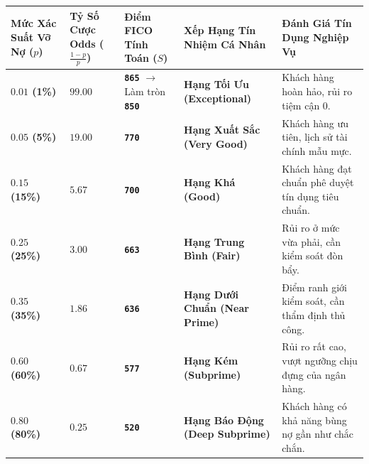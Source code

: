 \documentclass[
  13pt,
  a4paper,
]{report}
\newcounter{none} %
\begin{document}
{\def\LTcaptype{none} %
\begin{longtable}[]{@{}
  >{\centering\arraybackslash}p{}
  >{\centering\arraybackslash}p{}
  >{\centering\arraybackslash}p{}
  >{\centering\arraybackslash}p{}
  >{\raggedright\arraybackslash}p{}@{}}
\toprule\noalign{}
\begin{minipage}[b]{\linewidth}\centering
Mức Xác Suất Vỡ Nợ (\(p\))
\end{minipage} & \begin{minipage}[b]{\linewidth}\centering
Tỷ Số Cược Odds (\(\frac{1-p}{p}\))
\end{minipage} & \begin{minipage}[b]{\linewidth}\centering
Điểm FICO Tính Toán (\(S\))
\end{minipage} & \begin{minipage}[b]{\linewidth}\centering
Xếp Hạng Tín Nhiệm Cá Nhân
\end{minipage} & \begin{minipage}[b]{\linewidth}\raggedright
Đánh Giá Tín Dụng Nghiệp Vụ
\end{minipage} \\
\midrule\noalign{}
\endhead
\bottomrule\noalign{}
\endlastfoot
\textbf{\(0.01\) (1\%)} & \(99.00\) & \textbf{\texttt{865}}
\(\rightarrow\) Làm tròn \textbf{\texttt{850}} & \textbf{Hạng Tối Ưu
(Exceptional)} & Khách hàng hoàn hảo, rủi ro tiệm cận 0. \\
\textbf{\(0.05\) (5\%)} & \(19.00\) & \textbf{\texttt{770}} &
\textbf{Hạng Xuất Sắc (Very Good)} & Khách hàng ưu tiên, lịch sử tài
chính mẫu mực. \\
\textbf{\(0.15\) (15\%)} & \(5.67\) & \textbf{\texttt{700}} &
\textbf{Hạng Khá (Good)} & Khách hàng đạt chuẩn phê duyệt tín dụng tiêu
chuẩn. \\
\textbf{\(0.25\) (25\%)} & \(3.00\) & \textbf{\texttt{663}} &
\textbf{Hạng Trung Bình (Fair)} & Rủi ro ở mức vừa phải, cần kiểm soát
đòn bẩy. \\
\textbf{\(0.35\) (35\%)} & \(1.86\) & \textbf{\texttt{636}} &
\textbf{Hạng Dưới Chuẩn (Near Prime)} & Điểm ranh giới kiểm soát, cần
thẩm định thủ công. \\
\textbf{\(0.60\) (60\%)} & \(0.67\) & \textbf{\texttt{577}} &
\textbf{Hạng Kém (Subprime)} & Rủi ro rất cao, vượt ngưỡng chịu đựng của
ngân hàng. \\
\textbf{\(0.80\) (80\%)} & \(0.25\) & \textbf{\texttt{520}} &
\textbf{Hạng Báo Động (Deep Subprime)} & Khách hàng có khả năng bùng nợ
gần như chắc chắn. \\
\end{longtable}
}
\end{document}
